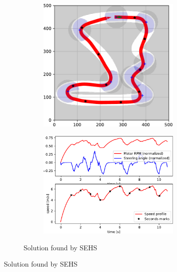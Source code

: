 \begin{figure}[!tbp]
	\vspace{0.75cm}
	
	\begin{subfigure}[t]{\textwidth}
		\begin{subfigure}[t]{0.45\textwidth}
			\includegraphics[width=\textwidth]{../img/experiments/tornado-sehs-trajectory}
		\end{subfigure}
		\hfill
		\begin{subfigure}[t]{0.45\textwidth}
			\includegraphics[width=\textwidth]{../img/experiments/tornado-sehs-actuators}
		\end{subfigure}
		\caption{Solution found by SEHS}
		\label{fig:solution_tornado-sehs}
	\end{subfigure}
	

\end{figure}

